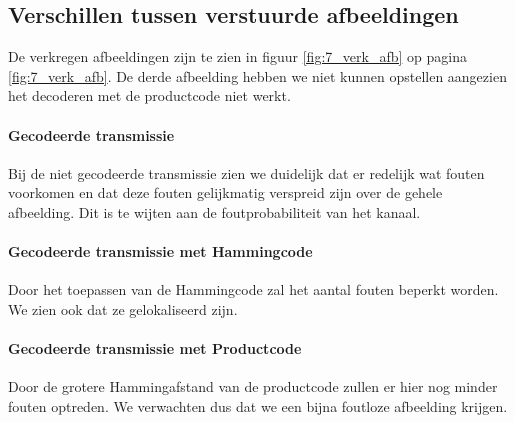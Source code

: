 \documentclass[11pt,a4paper]{article}
\begin{document}
\subsection{Verschillen tussen verstuurde afbeeldingen}
De verkregen afbeeldingen zijn te zien in figuur \ref{fig:7_verk_afb} op pagina \ref{fig:7_verk_afb}. De derde afbeelding hebben we niet kunnen opstellen aangezien het decoderen met de productcode niet werkt.

\paragraph*{Gecodeerde transmissie}
Bij de niet gecodeerde transmissie zien we duidelijk dat er redelijk wat fouten voorkomen en dat deze fouten gelijkmatig verspreid zijn over de gehele afbeelding. Dit is te wijten aan de foutprobabiliteit van het kanaal. 

\paragraph*{Gecodeerde transmissie met Hammingcode} Door het toepassen van de Hammingcode zal het aantal fouten beperkt worden. We zien ook dat ze gelokaliseerd zijn.

\paragraph*{Gecodeerde transmissie met Productcode} Door de grotere Hammingafstand van de productcode zullen er hier nog minder fouten optreden. We verwachten dus dat we een bijna foutloze afbeelding krijgen.
\end{document}
